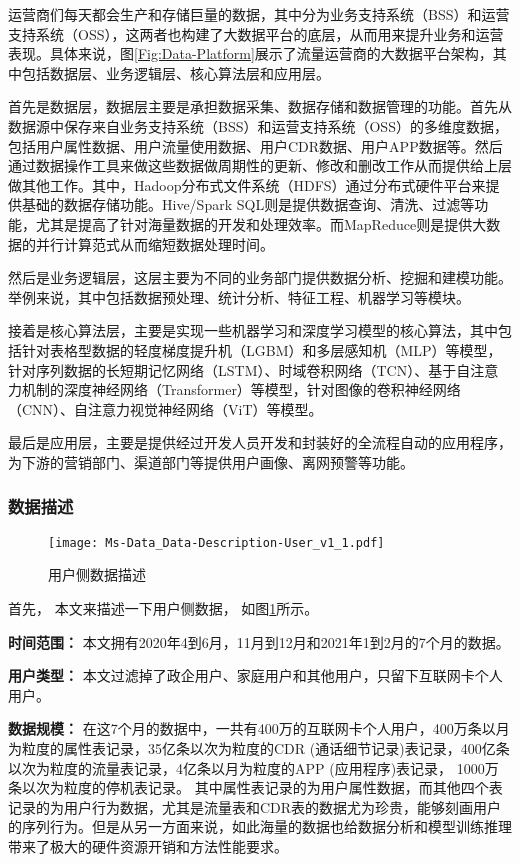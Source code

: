 运营商们每天都会生产和存储巨量的数据，其中分为业务支持系统（BSS）和运营支持系统（OSS），这两者也构建了大数据平台的底层，从而用来提升业务和运营表现。具体来说，图\ref{Fig:Data-Platform}展示了流量运营商的大数据平台架构，其中包括数据层、业务逻辑层、核心算法层和应用层。\par
首先是数据层，数据层主要是承担数据采集、数据存储和数据管理的功能。首先从数据源中保存来自业务支持系统（BSS）和运营支持系统（OSS）的多维度数据，包括用户属性数据、用户流量使用数据、用户CDR数据、用户APP数据等。然后通过数据操作工具来做这些数据做周期性的更新、修改和删改工作从而提供给上层做其他工作。其中，Hadoop分布式文件系统（HDFS）通过分布式硬件平台来提供基础的数据存储功能。Hive/Spark SQL则是提供数据查询、清洗、过滤等功能，尤其是提高了针对海量数据的开发和处理效率。而MapReduce则是提供大数据的并行计算范式从而缩短数据处理时间。\par
然后是业务逻辑层，这层主要为不同的业务部门提供数据分析、挖掘和建模功能。举例来说，其中包括数据预处理、统计分析、特征工程、机器学习等模块。\par
接着是核心算法层，主要是实现一些机器学习和深度学习模型的核心算法，其中包括针对表格型数据的轻度梯度提升机（LGBM）和多层感知机（MLP）等模型，针对序列数据的长短期记忆网络（LSTM）、时域卷积网络（TCN）、基于自注意力机制的深度神经网络（Transformer）等模型，针对图像的卷积神经网络（CNN）、自注意力视觉神经网络（ViT）等模型。\par
最后是应用层，主要是提供经过开发人员开发和封装好的全流程自动的应用程序，为下游的营销部门、渠道部门等提供用户画像、离网预警等功能。

\subsubsection{数据描述}
\begin{figure}[hbt]
	\centering
	\texttt{[image: Ms-Data\_Data-Description-User\_v1\_1.pdf]}
	\caption{用户侧数据描述}
	\label{Fig:User-Side-Data}
\end{figure}
首先， 本文来描述一下用户侧数据， 如图\ref{Fig:User-Side-Data}所示。\par
\textbf{时间范围：} 本文拥有2020年4到6月，11月到12月和2021年1到2月的7个月的数据。\par
\textbf{用户类型：} 本文过滤掉了政企用户、家庭用户和其他用户，只留下互联网卡个人用户。\par
\textbf{数据规模：} 在这7个月的数据中，一共有400万的互联网卡个人用户，400万条以月为粒度的属性表记录，35亿条以次为粒度的CDR (通话细节记录)表记录，400亿条以次为粒度的流量表记录，4亿条以月为粒度的APP (应用程序)表记录， 1000万条以次为粒度的停机表记录。
其中属性表记录的为用户属性数据，而其他四个表记录的为用户行为数据，尤其是流量表和CDR表的数据尤为珍贵，能够刻画用户的序列行为。但是从另一方面来说，如此海量的数据也给数据分析和模型训练推理带来了极大的硬件资源开销和方法性能要求。\par

